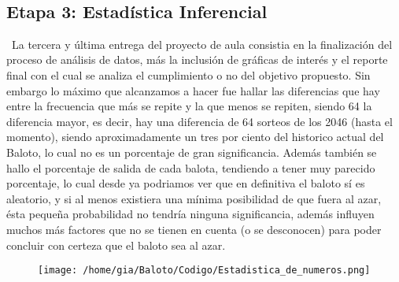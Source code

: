 \documentclass[11pt]{article}
\begin{document}
\
\subsection{Etapa 3: Estadística Inferencial}
\
La tercera y última entrega del proyecto de aula consistia en la finalización del proceso de análisis de datos, más la inclusión de gráficas de interés y el reporte final con el cual se analiza el cumplimiento o no del objetivo propuesto. Sin embargo lo máximo que alcanzamos a hacer fue hallar las diferencias que hay entre la frecuencia que más se repite y la que menos se repiten, siendo 64 la diferencia mayor, es decir, hay una diferencia de 64 sorteos de los 2046 (hasta el momento), siendo aproximadamente un tres por ciento del historico actual del Baloto, lo cual no es un porcentaje de gran significancia.
Además también se hallo el porcentaje de salida de cada balota, tendiendo a tener muy parecido porcentaje, lo cual desde ya podriamos ver que en definitiva el baloto sí es aleatorio, y si al menos existiera una mínima posibilidad de que fuera al azar, ésta pequeña probabilidad no tendría ninguna significancia, además influyen muchos más factores que no se tienen en cuenta (o se desconocen) para poder concluir con certeza que el baloto sea al azar. 

\begin{figure}[htp]
\centering
\texttt{[image: /home/gia/Baloto/Codigo/Estadistica\_de\_numeros.png]}
\caption{}
\label{}
\end{figure}
\end{document}
